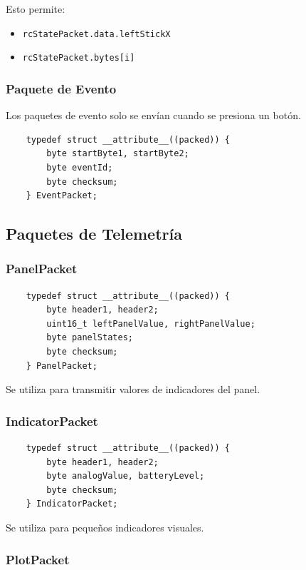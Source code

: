 \documentclass[12pt,a4paper]{article}
\newcommand{\ardfnOR}[1]{\texttt{\textcolor{arduinoOrange}{#1}}}
\begin{document}
Esto permite:

\begin{itemize}
	\item \ardfnOR{rcStatePacket}\texttt{.}\ardfnOR{data}\texttt{.}\ardfnOR{leftStickX}
	\item \ardfnOR{rcStatePacket}\texttt{.}\ardfnOR{bytes}\texttt{[i]}
\end{itemize}

\subsubsection{Paquete de Evento}

Los paquetes de evento solo se envían cuando se presiona un botón.

\begin{lstlisting}
	typedef struct __attribute__((packed)) {
		byte startByte1, startByte2;
		byte eventId;
		byte checksum;
	} EventPacket;
\end{lstlisting}

\subsection{Paquetes de Telemetría}

\subsubsection{PanelPacket}

\begin{lstlisting}
	typedef struct __attribute__((packed)) {
		byte header1, header2;
		uint16_t leftPanelValue, rightPanelValue;
		byte panelStates;
		byte checksum;
	} PanelPacket;
\end{lstlisting}

Se utiliza para transmitir valores de indicadores del panel.

\subsubsection{IndicatorPacket}

\begin{lstlisting}
	typedef struct __attribute__((packed)) {
		byte header1, header2;
		byte analogValue, batteryLevel;
		byte checksum;
	} IndicatorPacket;
\end{lstlisting}

Se utiliza para pequeños indicadores visuales.

\subsubsection{PlotPacket}
\end{document}
